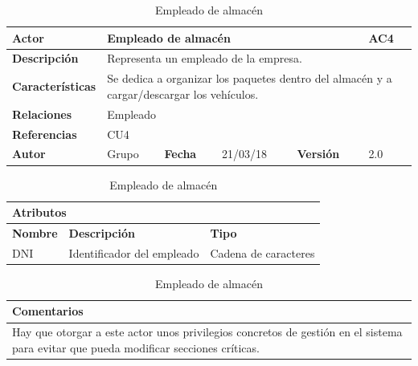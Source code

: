 \documentclass[12pt,spanish]{article}
\begin{document}
\begin{table}[H]

\centering
\begin{tabular}{|m{3cm}|m{4cm}|m{2cm}|m{2cm}|m{2cm}|m{1cm}|}
\hline
\textbf{Actor} &  \multicolumn{4}{m{8cm}|}{Empleado de almacén} \vline &  \cellcolor{gray!40}AC4 \\
\hline
\textbf{Descripción} & \multicolumn{5}{m{8cm}|}{Representa un empleado de la empresa.} \\
\hline
\textbf{Características} & \multicolumn{5}{m{8cm}|}{Se dedica a organizar los paquetes dentro del almacén y a cargar/descargar los vehículos.} \\
\hline
\textbf{Relaciones} &\multicolumn{5}{m{8cm}|}{Empleado} \\
\hline
\textbf{Referencias} & \multicolumn{5}{m{8cm}|}{CU4} \\
\hline
\textbf{Autor} & Grupo & \textbf{Fecha} & 21/03/18 & \textbf{Versión} & 2.0 \\
\hline
\end{tabular}

\vspace{1cm}

\begin{tabular}{|m{4cm}|m{7.3cm}|m{4cm}|}
\hline
\multicolumn{3}{|m{15.3cm}|}{\textbf{Atributos}} \\
\hline
\textbf{Nombre} & \textbf{Descripción} & \textbf{Tipo} \\
\hline
DNI & Identificador del empleado & Cadena de caracteres \\
\hline
\end{tabular}


\vspace{1cm}

\begin{tabular}{|m{16.2cm}|}
\hline
\textbf{Comentarios} \\
\hline
Hay que otorgar a este actor unos privilegios concretos de gestión en el sistema para evitar que pueda modificar secciones críticas. \\
\hline
\end{tabular}

\caption{Empleado de almacén}

\end{table}
\end{document}
